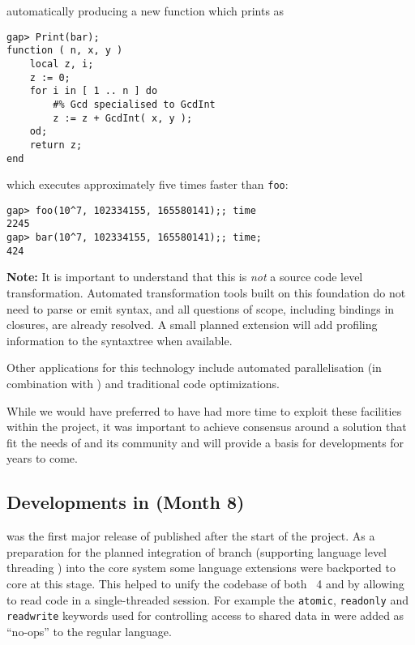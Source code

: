 automatically producing a new function which prints as

\begin{verbatim}
gap> Print(bar);
function ( n, x, y )
    local z, i;
    z := 0;
    for i in [ 1 .. n ] do
        #% Gcd specialised to GcdInt
        z := z + GcdInt( x, y );
    od;
    return z;
end
\end{verbatim}

which executes approximately five times faster than \verb|foo|:
\begin{verbatim}
gap> foo(10^7, 102334155, 165580141);; time
2245
gap> bar(10^7, 102334155, 165580141);; time;
424
\end{verbatim}

\textbf{Note:} It is important to understand that this is \emph{not} a
source code level transformation. Automated transformation tools built
on this foundation do
not need to parse or emit \GAP syntax, and all questions of scope,
including bindings in closures, are already resolved. A small planned
extension will add profiling information to the syntaxtree when available.

Other applications for this technology include automated
parallelisation (in combination with \HPCGAP) and traditional code optimizations.

While we would have preferred to have had more time to exploit these
facilities within the project, it was important to achieve consensus
around a solution that fit the needs of \GAP and its community and
will provide a basis for developments for years to come.

\subsection{Developments in  (Month 8)}\label{gap-4.8}


 was the first major release of \GAP published
after the start of the \ODK project. 
As a preparation for the planned integration of \HPCGAP branch
(supporting \GAP language level threading ) into
the core system some language extensions were backported to core
\GAP at this stage. 
This helped to unify the codebase of both \GAP~4 and \HPCGAP
by allowing to read \HPCGAP code in a single-threaded
\GAP session. For example the
\verb|atomic|, \verb|readonly| and \verb|readwrite| keywords used for
controlling access to shared data in \HPCGAP were
added as ``no-ops'' to the regular \GAP language.


